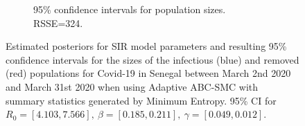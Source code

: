 \documentclass[11pt,a4paper]{article}
\theoremstyle{break}
\begin{document}
\begin{figure}[H]
{\begin{subfigure}{.45\paperwidth}
        \caption{95\% confidence intervals for population sizes. RSSE=324.}
        \label{fig_senegal_me_ci}
      \end{subfigure}
    }
    \caption{Estimated posteriors for SIR model parameters and resulting 95\% confidence intervals for the sizes of the infectious (blue) and removed (red) populations for Covid-19 in Senegal between March 2nd 2020 and March 31st 2020 when using Adaptive ABC-SMC with summary statistics generated by Minimum Entropy. 95\% CI for $R_0=[4.103,7.566],\ \beta=[0.185,0.211],\ \gamma=[0.049,0.012]$.}
    \label{fig_senegal_me}
  \end{figure}

  \begin{figure}[H]
    \centering
\end{figure}
\end{document}
